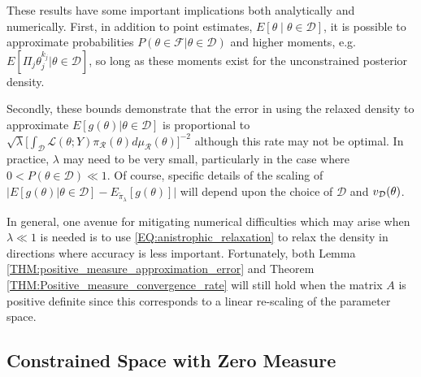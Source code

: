 \documentclass[10pt,fleqn]{article} \pdfoutput=1
\DeclareMathOperator{\1}{\mathbbm{1}} \DeclareMathOperator{\bigO}{\mc O}
\begin{document}
These results have some important implications both analytically and
numerically.  First, in addition to point estimates,
$E[\theta \mid \theta\in\mathcal{D}]$, it is possible to approximate
probabilities $P(\theta \in \mathcal{F}|\theta \in \mathcal{D})$ and higher
moments, e.g. $E[\Pi_j \theta_j^{k_j} |\theta\in\mathcal{D}]$, so long as
these moments exist for the unconstrained posterior density.

Secondly, these bounds demonstrate that the error in using the relaxed
density to approximate $E[g(\theta)|\theta\in\mathcal{D}]$ is proportional
to $\sqrt{\lambda} [\int_\mathcal{D}\mathcal{L}(\theta; Y)
		\pi_\mathcal{R}(\theta)d\mu_\mathcal{R}(\theta)\big]^{-2}$ although this
rate may not be optimal.  In practice, $\lambda$ may need to be very small,
particularly in the case where $0<P(\theta\in\mathcal{D})\ll 1.$ Of course,
specific details of the scaling of $\bigg|E[g(\theta)
	|\theta\in\mathcal{D}] - E_{\tilde{\pi}_\lambda}[g(\theta)]   \bigg|$ will
depend upon the choice of $\mathcal{D}$ and $v_{\mathcal{D}}(\theta)$.

In general, one avenue for mitigating numerical difficulties which may
arise when $\lambda \ll 1$ is needed is to use 
\eqref{EQ:anistrophic_relaxation} to relax the density in directions where
accuracy is less important.  Fortunately, both Lemma
\ref{THM:positive_measure_approximation_error} and Theorem
\ref{THM:Positive_measure_convergence_rate} will still hold when the matrix $A$ is
positive definite since this corresponds to a  linear re-scaling of the
parameter space.


\subsection{Constrained Space with Zero Measure}
\label{SEC:Zero_measure_theory}
\end{document}
